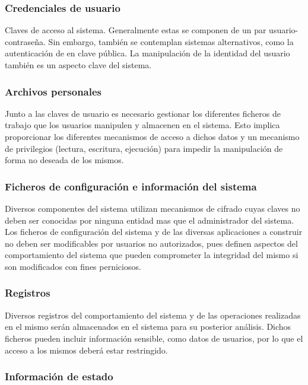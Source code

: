 \subsubsection{Credenciales de usuario}

Claves de acceso al sistema. Generalmente estas se componen de un par usuario-contraseña. Sin embargo, también se contemplan sistemas alternativos, como la autenticación de en clave pública. La manipulación de la identidad del usuario también es un aspecto clave del sistema.

\subsubsection{Archivos personales}

Junto a las claves de usuario es necesario gestionar los diferentes ficheros de trabajo que los usuarios manipulen y almacenen en el sistema. Esto implica proporcionar los diferentes mecanismos de acceso a dichos datos y un mecanismo de privilegios (lectura, escritura, ejecución) para impedir la manipulación de forma no deseada de los mismos.

\subsubsection{Ficheros de configuración e información del sistema}

Diversos componentes del sistema utilizan mecanismos de cifrado cuyas claves no deben ser conocidas por ninguna entidad mas que el administrador del sistema. Los ficheros de configuración del sistema y de las diversas aplicaciones a construir no deben ser modificables por usuarios no autorizados, pues definen aspectos del comportamiento del sistema que pueden comprometer la integridad del mismo si son modificados con fines perniciosos.

\subsubsection{Registros}

Diversos registros del comportamiento del sistema y de las operaciones realizadas en el mismo serán almacenados en el sistema para su posterior análisis. Dichos ficheros pueden incluir información sensible, como datos de usuarios, por lo que el acceso a los mismos deberá estar restringido.

\subsubsection{Información de estado}

